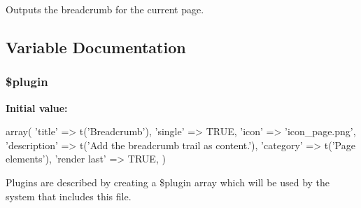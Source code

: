 Outputs the breadcrumb for the current page. 

\subsection{Variable Documentation}
\hypertarget{page__breadcrumb_8inc_ada8a7130088351710bb02ed622d6bf65}{
\subsubsection[{\$plugin}]{\setlength{\rightskip}{0pt plus 5cm}\$plugin}}
\label{page__breadcrumb_8inc_ada8a7130088351710bb02ed622d6bf65}
{\bfseries Initial value:}
\begin{DoxyCode}
 array(
  'title' => t('Breadcrumb'),
  'single' => TRUE,
  'icon' => 'icon_page.png',
  'description' => t('Add the breadcrumb trail as content.'),
  'category' => t('Page elements'),
  'render last' => TRUE,
)
\end{DoxyCode}
Plugins are described by creating a \$plugin array which will be used by the system that includes this file. 